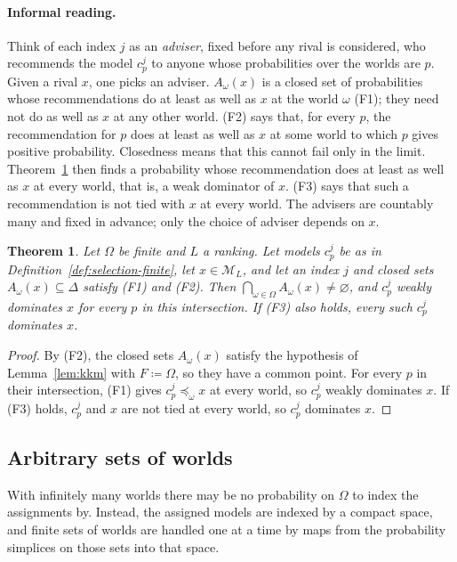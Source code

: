 \documentclass[11pt]{article}
\newtheorem{theorem}{Theorem}[section]
\theoremstyle{definition}
\theoremstyle{remark}
\newcommand{\M}{\mathcal M}
\begin{document}
\paragraph{Informal reading.} Think of each index $j$ as an \emph{adviser}, fixed before any rival is considered, who recommends the model $c^j_p$ to anyone whose probabilities over the worlds are $p$. Given a rival $x$, one picks an adviser. $A_\omega(x)$ is a closed set of probabilities whose recommendations do at least as well as $x$ at the world $\omega$ (F1); they need not do as well as $x$ at any other world. (F2) says that, for every $p$, the recommendation for $p$ does at least as well as $x$ at some world to which $p$ gives positive probability. Closedness means that this cannot fail only in the limit. Theorem~\ref{thm:finite} then finds a probability whose recommendation does at least as well as $x$ at every world, that is, a weak dominator of $x$. (F3) says that such a recommendation is not tied with $x$ at every world. The advisers are countably many and fixed in advance; only the choice of adviser depends on $x$.

\begin{theorem}\label{thm:finite}
Let $\Omega$ be finite and $L$ a ranking. Let models $c^j_p$ be as in Definition~\ref{def:selection-finite}, let $x\in\M_L$, and let an index $j$ and closed sets $A_\omega(x)\subseteq\Delta$ satisfy (F1) and (F2). Then $\bigcap_{\omega\in\Omega}A_\omega(x)\ne\varnothing$, and $c^j_p$ weakly dominates $x$ for every $p$ in this intersection. If (F3) also holds, every such $c^j_p$ dominates $x$.
\end{theorem}
\begin{proof}
By (F2), the closed sets $A_\omega(x)$ satisfy the hypothesis of Lemma~\ref{lem:kkm} with $F\coloneqq\Omega$, so they have a common point. For every $p$ in their intersection, (F1) gives $c^j_p\preceq_\omega x$ at every world, so $c^j_p$ weakly dominates $x$. If (F3) holds, $c^j_p$ and $x$ are not tied at every world, so $c^j_p$ dominates $x$.
\end{proof}
\endgroup

\subsection{Arbitrary sets of worlds}

{\color{red}With infinitely many worlds there may be no probability on $\Omega$ to index the assignments by. Instead, the assigned models are indexed by a compact space, and finite sets of worlds are handled one at a time by maps from the probability simplices on those sets into that space.}
\end{document}
